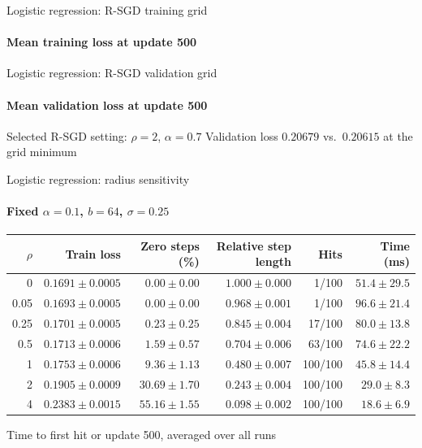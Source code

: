 \documentclass[aspectratio=169,xcolor=table]{beamer}
\begin{document}
\begin{frame}{Logistic regression: R-SGD training grid}
    \framesubtitle{Mean training loss at update 500}
    \centering
    \renewcommand{\arraystretch}{1.25}
    \setlength{\tabcolsep}{4pt}
    
\end{frame}

\begin{frame}{Logistic regression: R-SGD validation grid}
    \framesubtitle{Mean validation loss at update 500}
    \centering
    \renewcommand{\arraystretch}{1.18}
    \setlength{\tabcolsep}{4pt}
    
    \vspace{0.6em}

    \begin{block}{Selected R-SGD setting: \(\rho=2\), \(\alpha=0.7\)}
        Validation loss \(0.20679\) vs.\ \(0.20615\) at the grid minimum
    \end{block}
\end{frame}

\begin{frame}{Logistic regression: radius sensitivity}
    \framesubtitle{Fixed \(\alpha=0.1\), \(b=64\), \(\sigma=0.25\)}
    \centering
    \small
    \renewcommand{\arraystretch}{1.12}
    \begin{tabular}{rrrrrr}
        \toprule
        \(\rho\) & Train loss & Zero steps (\%) & Relative step length & Hits & Time (ms) \\
        \midrule
        0     & \(0.1691\pm0.0005\) & \(0.00\pm0.00\) & \(1.000\pm0.000\) & 1/100    & \(51.4\pm29.5\) \\
        0.05  & \(0.1693\pm0.0005\) & \(0.00\pm0.00\) & \(0.968\pm0.001\) & 1/100    & \(96.6\pm21.4\) \\
        0.25  & \(0.1701\pm0.0005\) & \(0.23\pm0.25\) & \(0.845\pm0.004\) & 17/100   & \(80.0\pm13.8\) \\
        0.5   & \(0.1713\pm0.0006\) & \(1.59\pm0.57\) & \(0.704\pm0.006\) & 63/100   & \(74.6\pm22.2\) \\
        1     & \(0.1753\pm0.0006\) & \(9.36\pm1.13\) & \(0.480\pm0.007\) & 100/100  & \(45.8\pm14.4\) \\
        2     & \(0.1905\pm0.0009\) & \(30.69\pm1.70\) & \(0.243\pm0.004\) & 100/100 & \(29.0\pm8.3\) \\
        4     & \(0.2383\pm0.0015\) & \(55.16\pm1.55\) & \(0.098\pm0.002\) & 100/100 & \(18.6\pm6.9\) \\
        \bottomrule
    \end{tabular}

    \medskip
    Time to first hit or update 500, averaged over all runs
\end{frame}
\end{document}
